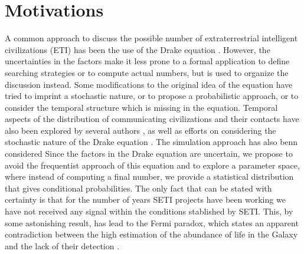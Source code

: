 \documentclass[crop]{CSLB}%
\begin{document}




\maketitle

\Fpagebreak


\section{Motivations}\label{S_motivations}

A common approach to discuss the possible number of extraterrestrial
intelligent civilizations (ETI) has been the use of the Drake equation
\citep{gleiser_drake_2010, prantzos_joint_2013, haqq-misra_drake_2017}.
%
However, the uncertainties in the factors make it less prone to a
formal application to define searching strategies or to compute
actual numbers, but is used to organize the discussion instead.
%
Some modifications to the original idea of the equation have tried to
imprint a stochastic nature, or to propose a probabilistic approach,
or to consider the temporal structure which is missing in the
equation.
%
Temporal aspects of the distribution of communicating civilizations
and their contacts have also been explored by several authors
\citep{fogg_temporal_1987,forgan_spatiotemporal_2011, balbi_impact_2018},
%
as well as efforts on considering the stochastic nature of the Drake equation
\citep{glade_stochastic_2011}.
%
The simulation approach has also benn considered
\citep{forgan_evaluating_2015, vukotic_grandeur_2016,
murante_simulating_2015, forgan_numerical_2009, forgan_galactic_2017}
%
Since the factors in the Drake equation are uncertain, we propose to
avoid the frequentist approach of this equation
and to explore a parameter space, where instead of computing a final
number, we provide a statistical distribution that gives conditional
probabilities.
%
The only fact that can be stated with certainty is that for the number
of years SETI projects have been working we have not received any
signal within the conditions stablished by SETI.
%
This, by some astonishing result, has lead to the Fermi paradox, which
states an apparent contradiction between the high estimation of the
abundance of life in the Galaxy and the lack of their detection
\citep{anchordoqui_isthere_2017}.
\end{document}
